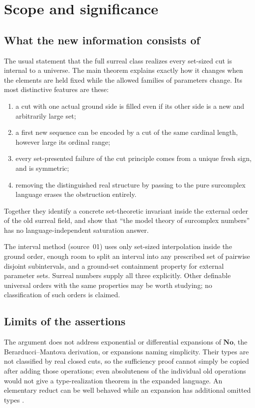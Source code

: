 \documentclass[11pt,letterpaper]{article}
\numberwithin{equation}{section}
\theoremstyle{definition}
\theoremstyle{remark}
\newcommand{\No}{\mathbf{No}}
\begin{document}
\section{Scope and significance}\label{univ:sec:scope}

\subsection{What the new information consists of}

The usual statement that the full surreal class realizes every set-sized cut
is internal to a universe. The main theorem explains exactly how it changes
when the elements are held fixed while the allowed families of parameters
change. Its most distinctive features are these:
\begin{enumerate}
\item a cut with one actual ground side is filled even if its other side is a
new and arbitrarily large set;
\item a first new sequence can be encoded by a cut of the same cardinal length,
however large its ordinal range;
\item every set-presented failure of the cut principle comes from a unique
fresh sign, and is symmetric;
\item removing the distinguished real structure by passing to the pure
surcomplex language erases the obstruction entirely.
\end{enumerate}
Together they identify a concrete set-theoretic invariant inside the external
order of the old surreal field, and show that ``the model theory of surcomplex
numbers'' has no language-independent saturation answer.

The interval method (source~01) uses only set-sized interpolation inside the
ground order, enough room to split an interval into any prescribed set of
pairwise disjoint subintervals, and a ground-set containment property for
external parameter sets. Surreal numbers supply all three explicitly. Other
definable universal orders with the same properties may be worth studying; no
classification of such orders is claimed.

\subsection{Limits of the assertions}

The argument does not address exponential or differential expansions of $\No$,
the Berarducci--Mantova derivation, or expansions naming simplicity. Their
types are not classified by real closed cuts, so the sufficiency proof cannot
simply be copied after adding those operations; even absoluteness of the
individual old operations would not give a type-realization theorem in the
expanded language. An elementary reduct can be well behaved while an expansion
has additional omitted types \cite{EhrlichKaplan,vdDE2018}.
\end{document}
